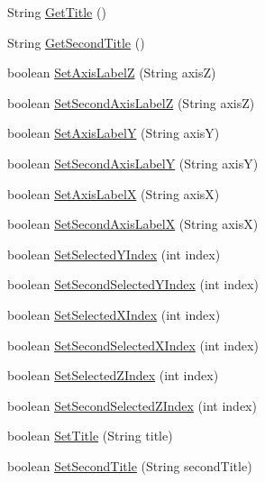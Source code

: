\begin{DoxyCompactItemize}
\item 
String \hyperlink{class_data_attribute_ade9747a192ba22fe1020e874bff6a48c}{Get\-Title} ()
\item 
String \hyperlink{class_data_attribute_a4079522c93025fce7569eaed585f4aeb}{Get\-Second\-Title} ()
\item 
boolean \hyperlink{class_data_attribute_a1b57fd911860c75a1aa5ded4c0c2d707}{Set\-Axis\-Label\-Z} (String axis\-Z)
\item 
boolean \hyperlink{class_data_attribute_a1b7436f51b0079c492b6451500230329}{Set\-Second\-Axis\-Label\-Z} (String axis\-Z)
\item 
boolean \hyperlink{class_data_attribute_a31655976e5ce4d6be0b07b0a0bdcf3fc}{Set\-Axis\-Label\-Y} (String axis\-Y)
\item 
boolean \hyperlink{class_data_attribute_aa991ca454981460ff011efa92a63b83c}{Set\-Second\-Axis\-Label\-Y} (String axis\-Y)
\item 
boolean \hyperlink{class_data_attribute_a2d8c2f41d2847e3bbcb8b869d15e97f3}{Set\-Axis\-Label\-X} (String axis\-X)
\item 
boolean \hyperlink{class_data_attribute_a0749b154967281fc88c3d50b61b82ec7}{Set\-Second\-Axis\-Label\-X} (String axis\-X)
\item 
boolean \hyperlink{class_data_attribute_a444715eaafbe1340988daf35860754f4}{Set\-Selected\-Y\-Index} (int index)
\item 
boolean \hyperlink{class_data_attribute_a89b55444718059d538f3e0ad7d9b8461}{Set\-Second\-Selected\-Y\-Index} (int index)
\item 
boolean \hyperlink{class_data_attribute_af3501ac788c06132211c36fd6655ec6c}{Set\-Selected\-X\-Index} (int index)
\item 
boolean \hyperlink{class_data_attribute_afb6eab1f1b118109a5241e1a1693a0ad}{Set\-Second\-Selected\-X\-Index} (int index)
\item 
boolean \hyperlink{class_data_attribute_a16aa8d21073abdba7d0327bed1bb58a5}{Set\-Selected\-Z\-Index} (int index)
\item 
boolean \hyperlink{class_data_attribute_afac1fe5dedb6af027de391df11cb4421}{Set\-Second\-Selected\-Z\-Index} (int index)
\item 
boolean \hyperlink{class_data_attribute_a434e57b34476663c13eb6dc37ef05cd2}{Set\-Title} (String title)
\item 
boolean \hyperlink{class_data_attribute_ab7c3ae470051e011aa22725ad9ebab58}{Set\-Second\-Title} (String second\-Title)
\item 

\end{DoxyCompactItemize}
